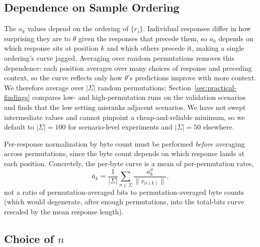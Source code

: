 \subsection{Dependence on Sample Ordering}\label{sec:ordering}

The $a_k$ values depend on the ordering of $\{r_i\}$.
Individual responses differ in how surprising they are to $\theta$ given the responses that precede them, so $a_k$ depends on which response sits at position $k$ and which others precede it, making a single ordering's curve jagged.
Averaging over random permutations removes this dependence: each position averages over many choices of response and preceding context, so the curve reflects only how $\theta$'s predictions improve with more context.
We therefore average over $|\Sigma|$ random permutations; Section~\ref{sec:practical-findings} compares low- and high-permutation runs on the validation scenarios and finds that the low setting misranks adjacent scenarios.
We have not swept intermediate values and cannot pinpoint a cheap-and-reliable minimum, so we default to $|\Sigma| = 100$ for scenario-level experiments and $|\Sigma| = 50$ elsewhere.

Per-response normalization by byte count must be performed \emph{before} averaging across permutations, since the byte count depends on which response lands at each position.
Concretely, the per-byte curve is a mean of per-permutation rates,
\begin{equation}\label{eq:akbar-mor}
    \bar{a}_k = \frac{1}{|\Sigma|}\sum_{\sigma \in \Sigma} \frac{a_k^{\sigma}}{\|r_{\sigma(k)}\|},
\end{equation}
not a ratio of permutation-averaged bits to permutation-averaged byte counts (which would degenerate, after enough permutations, into the total-bits curve rescaled by the mean response length).

\subsection{Choice of $n$}

